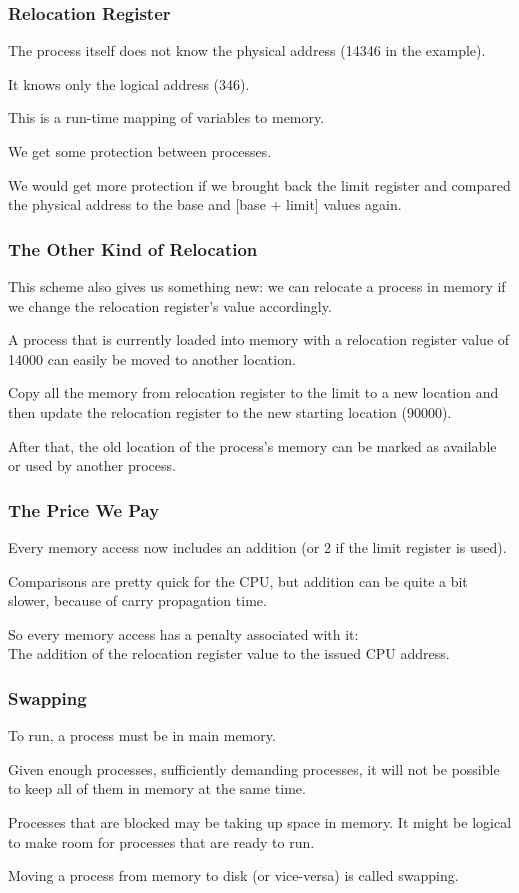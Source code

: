 \begin{frame}
\frametitle{Relocation Register}

The process itself does not know the physical address (14346 in the example).

It knows only the logical address (346). 

This is a run-time mapping of variables to memory.  

We get some protection between processes.

We would get more protection if we brought back the limit register and compared the physical address to the base and [base + limit] values again. 


\end{frame}

\begin{frame}
\frametitle{The Other Kind of Relocation}

This scheme also gives us something new: we can relocate a process in memory if we change the relocation register's value accordingly. 

A process that is currently loaded into memory with a relocation register value of 14000 can easily be moved to another location. 

Copy all the memory from relocation register to the limit to a new location and then update the relocation register to the new starting location (90000). 

After that, the old location of the process's memory can be marked as available or used by another process.

\end{frame}

\begin{frame}
\frametitle{The Price We Pay}

Every memory access now includes an addition (or 2 if the limit register is used). 

Comparisons are pretty quick for the CPU, but addition can be quite a bit slower, because of carry propagation time.

So every memory access has a penalty associated with it: \\
\quad The addition of the relocation register value to the issued CPU address.

\end{frame}

\begin{frame}
\frametitle{Swapping}


To run, a process must be in main memory. 

Given enough processes, sufficiently demanding processes, it will not be possible to keep all of them in memory at the same time. 

Processes that are blocked may be taking up space in memory. It might be logical to make room for processes that are ready to run.

Moving a process from memory to disk (or vice-versa) is called \alert{swapping}.

\end{frame}

